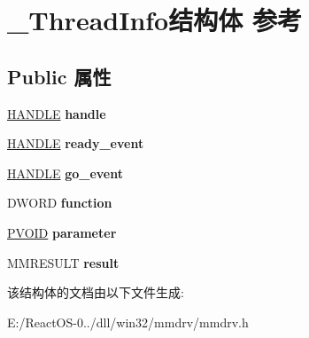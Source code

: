 \hypertarget{struct___thread_info}{}\section{\+\_\+\+Thread\+Info结构体 参考}
\label{struct___thread_info}
\subsection*{Public 属性}
\begin{DoxyCompactItemize}
\item 
\mbox{\label{struct___thread_info_a0b658fe517617e7b89306fef8ce9e438}} 
\hyperlink{interfacevoid}{H\+A\+N\+D\+LE} {\bfseries handle}
\item 
\mbox{\label{struct___thread_info_a378de2b2afc4f2c28d4c2bba4044f0ac}} 
\hyperlink{interfacevoid}{H\+A\+N\+D\+LE} {\bfseries ready\+\_\+event}
\item 
\mbox{\label{struct___thread_info_abcb7f0eca4dddecd5ba634c6bb0e4d28}} 
\hyperlink{interfacevoid}{H\+A\+N\+D\+LE} {\bfseries go\+\_\+event}
\item 
\mbox{\label{struct___thread_info_a5538068db27ad01b9a31c0d5e224e7e1}} 
D\+W\+O\+RD {\bfseries function}
\item 
\mbox{\label{struct___thread_info_a522417396a4fd52e8a09588d5200c3b9}} 
\hyperlink{interfacevoid}{P\+V\+O\+ID} {\bfseries parameter}
\item 
\mbox{\label{struct___thread_info_a0b5190ce194f01ccc4db8bb2b86284e6}} 
M\+M\+R\+E\+S\+U\+LT {\bfseries result}
\end{DoxyCompactItemize}


该结构体的文档由以下文件生成\+:\begin{DoxyCompactItemize}
\item 
E\+:/\+React\+O\+S-\/0../dll/win32/mmdrv/mmdrv.\+h\end{DoxyCompactItemize}
